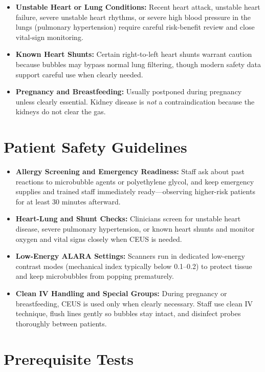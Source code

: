 \begin{itemize}
    \item \textbf{Unstable Heart or Lung Conditions:} Recent heart attack, unstable heart failure, severe unstable heart rhythms, or severe high blood pressure in the lungs (pulmonary hypertension) require careful risk-benefit review and close vital-sign monitoring.
    \item \textbf{Known Heart Shunts:} Certain right-to-left heart shunts warrant caution because bubbles may bypass normal lung filtering, though modern safety data support careful use when clearly needed.
    \item \textbf{Pregnancy and Breastfeeding:} Usually postponed during pregnancy unless clearly essential. Kidney disease is \emph{not} a contraindication because the kidneys do not clear the gas.
\end{itemize}

\section{Patient Safety Guidelines}

\begin{itemize}
    \item \textbf{Allergy Screening and Emergency Readiness:} Staff ask about past reactions to microbubble agents or polyethylene glycol, and keep emergency supplies and trained staff immediately ready---observing higher-risk patients for at least 30 minutes afterward.
    \item \textbf{Heart-Lung and Shunt Checks:} Clinicians screen for unstable heart disease, severe pulmonary hypertension, or known heart shunts and monitor oxygen and vital signs closely when CEUS is needed.
    \item \textbf{Low-Energy ALARA Settings:} Scanners run in dedicated low-energy contrast modes (mechanical index typically below 0.1--0.2) to protect tissue and keep microbubbles from popping prematurely.
    \item \textbf{Clean IV Handling and Special Groups:} During pregnancy or breastfeeding, CEUS is used only when clearly necessary. Staff use clean IV technique, flush lines gently so bubbles stay intact, and disinfect probes thoroughly between patients.
\end{itemize}

\section{Prerequisite Tests}

